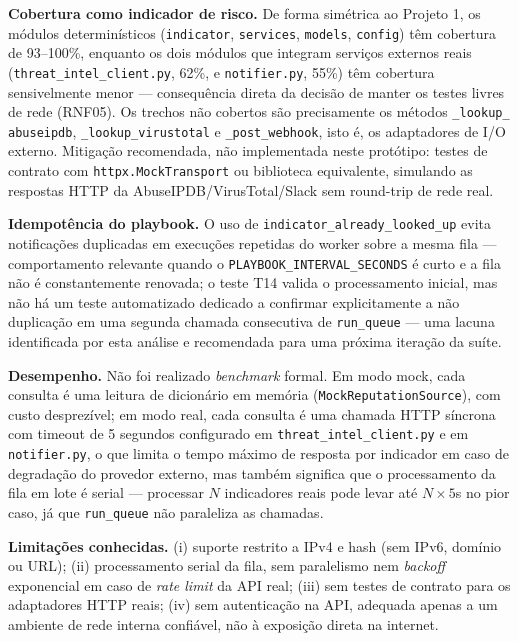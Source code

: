 \documentclass[11pt,a4paper]{article}
\begin{document}
\textbf{Cobertura como indicador de risco.} De forma simétrica ao Projeto 1, os módulos
determinísticos (\texttt{indicator}, \texttt{services}, \texttt{models}, \texttt{config})
têm cobertura de 93--100\%, enquanto os dois módulos que integram serviços externos reais
(\texttt{threat\_intel\_client.py}, 62\%, e \texttt{notifier.py}, 55\%) têm cobertura
sensivelmente menor --- consequência direta da decisão de manter os testes livres de
rede (RNF05). Os trechos não cobertos são precisamente os métodos \texttt{\_lookup\_
abuseipdb}, \texttt{\_lookup\_virustotal} e \texttt{\_post\_webhook}, isto é, os
adaptadores de I/O externo. Mitigação recomendada, não implementada neste protótipo:
testes de contrato com \texttt{httpx.MockTransport} ou biblioteca equivalente,
simulando as respostas HTTP da AbuseIPDB/VirusTotal/Slack sem round-trip de rede real.

\textbf{Idempotência do playbook.} O uso de \texttt{indicator\_already\_looked\_up}
evita notificações duplicadas em execuções repetidas do worker sobre a mesma fila ---
comportamento relevante quando o \texttt{PLAYBOOK\_INTERVAL\_SECONDS} é curto e a fila
não é constantemente renovada; o teste T14 valida o processamento inicial, mas não há
um teste automatizado dedicado a confirmar explicitamente a não duplicação em uma
segunda chamada consecutiva de \texttt{run\_queue} --- uma lacuna identificada por esta
análise e recomendada para uma próxima iteração da suíte.

\textbf{Desempenho.} Não foi realizado \emph{benchmark} formal. Em modo mock, cada
consulta é uma leitura de dicionário em memória (\texttt{MockReputationSource}), com
custo desprezível; em modo real, cada consulta é uma chamada HTTP síncrona com timeout
de 5 segundos configurado em \texttt{threat\_intel\_client.py} e em
\texttt{notifier.py}, o que limita o tempo máximo de resposta por indicador em caso de
degradação do provedor externo, mas também significa que o processamento da fila em
lote é serial --- processar $N$ indicadores reais pode levar até $N \times 5$s no pior
caso, já que \texttt{run\_queue} não paraleliza as chamadas.

\textbf{Limitações conhecidas.} (i) suporte restrito a IPv4 e hash (sem IPv6, domínio
ou URL); (ii) processamento serial da fila, sem paralelismo nem \emph{backoff}
exponencial em caso de \emph{rate limit} da API real; (iii) sem testes de contrato para
os adaptadores HTTP reais; (iv) sem autenticação na API, adequada apenas a um ambiente
de rede interna confiável, não à exposição direta na internet.
\end{document}
